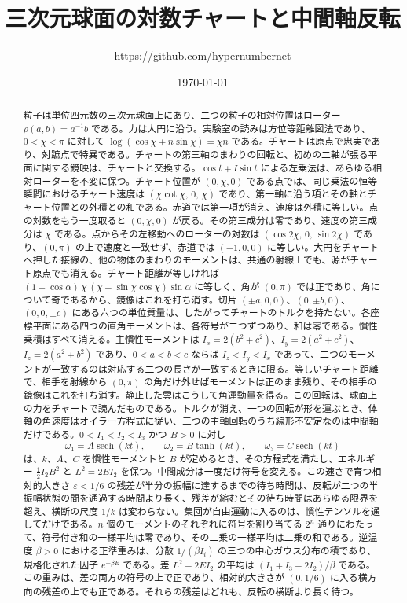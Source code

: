 \documentclass[a4paper]{article}
\title{三次元球面の対数チャートと中間軸反転}
\author{https://github.com/hypernumbernet}
\date{\today}
\begin{document}
\maketitle

\begin{abstract}
粒子は単位四元数の三次元球面上にあり、二つの粒子の相対位置はローター \(\rho(a,b)=a^{-1}b\) である。力は大円に沿う。実験室の読みは方位等距離図法であり、\(0<\chi<\pi\) に対して \(\log(\cos\chi+n\sin\chi)=\chi n\) である。チャートは原点で忠実であり、対蹠点で特異である。チャートの第三軸のまわりの回転と、初めの二軸が張る平面に関する鏡映は、チャートと交換する。\(\cos t+I\sin t\) による左乗法は、あらゆる相対ローターを不変に保つ。チャート位置が \((0,\chi,0)\) である点では、同じ乗法の恒等瞬間におけるチャート速度は \((\chi\cot\chi,\,0,\,\chi)\) であり、第一軸に沿う項とその軸とチャート位置との外積との和である。赤道では第一項が消え、速度は外積に等しい。点の対数をもう一度取ると \((0,\chi,0)\) が戻る。その第三成分は零であり、速度の第三成分は \(\chi\) である。点からその左移動へのローターの対数は \((\cos 2\chi,\,0,\,\sin 2\chi)\) であり、\((0,\pi)\) の上で速度と一致せず、赤道では \((-1,0,0)\) に等しい。大円をチャートへ押した接線の、他の物体のまわりのモーメントは、共通の射線上でも、源がチャート原点でも消える。チャート距離が等しければ \((1-\cos\alpha)\,\chi\,(\chi-\sin\chi\cos\chi)\sin\alpha\) に等しく、角が \((0,\pi)\) では正であり、角について奇であるから、鏡像はこれを打ち消す。切片 \((\pm a,0,0)\)、\((0,\pm b,0)\)、\((0,0,\pm c)\) にある六つの単位質量は、したがってチャートのトルクを持たない。各座標平面にある四つの直角モーメントは、各符号が二つずつあり、和は零である。慣性乗積はすべて消える。主慣性モーメントは \(I_x=2(b^2+c^2)\)、\(I_y=2(a^2+c^2)\)、\(I_z=2(a^2+b^2)\) であり、\(0<a<b<c\) ならば \(I_z<I_y<I_x\) であって、二つのモーメントが一致するのは対応する二つの長さが一致するときに限る。等しいチャート距離で、相手を射線から \((0,\pi)\) の角だけ外せばモーメントは正のまま残り、その相手の鏡像はこれを打ち消す。静止した雲はこうして角運動量を得る。この回転は、球面上の力をチャートで読んだものである。トルクが消え、一つの回転が形を運ぶとき、体軸の角速度はオイラー方程式に従い、三つの主軸回転のうち線形不安定なのは中間軸だけである。\(0<I_1<I_2<I_3\) かつ \(B>0\) に対し
\[
\omega_1=A\operatorname{sech}(kt),\qquad
\omega_2=B\tanh(kt),\qquad
\omega_3=C\operatorname{sech}(kt)
\]
は、\(k\)、\(A\)、\(C\) を慣性モーメントと \(B\) が定めるとき、その方程式を満たし、エネルギー \(\tfrac12 I_2 B^2\) と \(L^2=2EI_2\) を保つ。中間成分は一度だけ符号を変える。この速さで育つ相対的大きさ \(\varepsilon<1/6\) の残差が半分の振幅に達するまでの待ち時間は、反転が二つの半振幅状態の間を通過する時間より長く、残差が縮むとその待ち時間はあらゆる限界を超え、横断の尺度 \(1/k\) は変わらない。集団が自由運動に入るのは、慣性テンソルを通してだけである。\(n\) 個のモーメントのそれぞれに符号を割り当てる \(2^n\) 通りにわたって、符号付き和の一様平均は零であり、その二乗の一様平均は二乗の和である。逆温度 \(\beta>0\) における正準重みは、分散 \(1/(\beta I_i)\) の三つの中心ガウス分布の積であり、規格化された因子 \(e^{-\beta E}\) である。差 \(L^2-2EI_2\) の平均は \((I_1+I_3-2I_2)/\beta\) である。この重みは、差の両方の符号の上で正であり、相対的大きさが \((0,1/6)\) に入る横方向の残差の上でも正である。それらの残差はどれも、反転の横断より長く待つ。
\end{abstract}
\end{document}
